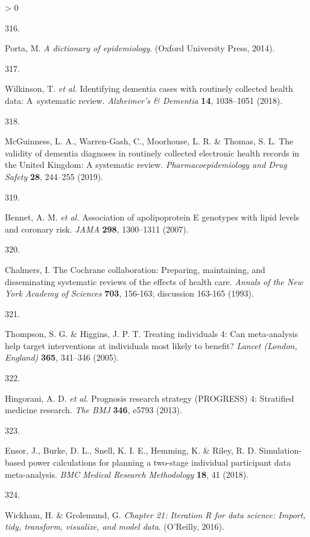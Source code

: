 \documentclass[a4paper, twoside]{templates/ociamthesis}
\newlength{\cslhangindent}
\newlength{\csllabelwidth}
\newenvironment{CSLReferences}[3] %
 {%
  \setlength{\parindent}{0pt}
  \ifodd #1 \everypar{\setlength{\hangindent}{\cslhangindent}}\ignorespaces\fi
  \ifnum #2 > 0
  \setlength{\parskip}{#2\baselineskip}
  \fi
 }%
 {}
\newcommand{\CSLLeftMargin}[1]{\parbox[t]{\maxof{\widthof{#1}}{\csllabelwidth}}{#1}}
\newcommand{\CSLRightInline}[1]{\parbox[t]{\linewidth - \csllabelwidth}{#1}}
\begin{document}
\begin{CSLReferences}{0}{0}
\leavevmode\hypertarget{ref-porta2014}{}%
\CSLLeftMargin{316. }
\CSLRightInline{Porta, M. \emph{A dictionary of epidemiology}. ({Oxford University Press}, 2014).}

\leavevmode\hypertarget{ref-wilkinson2018}{}%
\CSLLeftMargin{317. }
\CSLRightInline{Wilkinson, T. \emph{et al.} Identifying dementia cases with routinely collected health data: A~systematic review. \emph{Alzheimer's \& Dementia} \textbf{14}, 1038--1051 (2018).}

\leavevmode\hypertarget{ref-mcguinness2019validity}{}%
\CSLLeftMargin{318. }
\CSLRightInline{McGuinness, L. A., Warren-Gash, C., Moorhouse, L. R. \& Thomas, S. L. The validity of dementia diagnoses in routinely collected electronic health records in the {United Kingdom}: A systematic review. \emph{Pharmacoepidemiology and Drug Safety} \textbf{28}, 244--255 (2019).}

\leavevmode\hypertarget{ref-bennet2007}{}%
\CSLLeftMargin{319. }
\CSLRightInline{Bennet, A. M. \emph{et al.} Association of apolipoprotein {E} genotypes with lipid levels and coronary risk. \emph{JAMA} \textbf{298}, 1300--1311 (2007).}

\leavevmode\hypertarget{ref-chalmers1993}{}%
\CSLLeftMargin{320. }
\CSLRightInline{Chalmers, I. The {Cochrane} collaboration: Preparing, maintaining, and disseminating systematic reviews of the effects of health care. \emph{Annals of the New York Academy of Sciences} \textbf{703}, 156-163; discussion 163-165 (1993).}

\leavevmode\hypertarget{ref-thompson2005}{}%
\CSLLeftMargin{321. }
\CSLRightInline{Thompson, S. G. \& Higgins, J. P. T. Treating individuals 4: Can meta-analysis help target interventions at individuals most likely to benefit? \emph{Lancet (London, England)} \textbf{365}, 341--346 (2005).}

\leavevmode\hypertarget{ref-hingorani2013}{}%
\CSLLeftMargin{322. }
\CSLRightInline{Hingorani, A. D. \emph{et al.} Prognosis research strategy ({PROGRESS}) 4: Stratified medicine research. \emph{The BMJ} \textbf{346}, e5793 (2013).}

\leavevmode\hypertarget{ref-ensor2018}{}%
\CSLLeftMargin{323. }
\CSLRightInline{Ensor, J., Burke, D. L., Snell, K. I. E., Hemming, K. \& Riley, R. D. Simulation-based power calculations for planning a two-stage individual participant data meta-analysis. \emph{BMC Medical Research Methodology} \textbf{18}, 41 (2018).}

\leavevmode\hypertarget{ref-wickham2016func}{}%
\CSLLeftMargin{324. }
\CSLRightInline{Wickham, H. \& Grolemund, G. \emph{Chapter 21: Iteration \textbar{} {R} for data science: Import, tidy, transform, visualize, and model data}. ({O'Reilly}, 2016).}


\end{CSLReferences}
\end{document}
